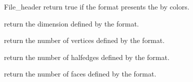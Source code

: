 \begin{ccRefClass}{File_header}
 {return true if the format presents the  by colors.}

 {return the dimension defined by the format.}

 {return the number of vertices defined by the format.}

 {return the number of halfedges defined by the format.}

 {return the number of faces defined by the format.}

\end{ccRefClass} %

\ccRefPageEnd












